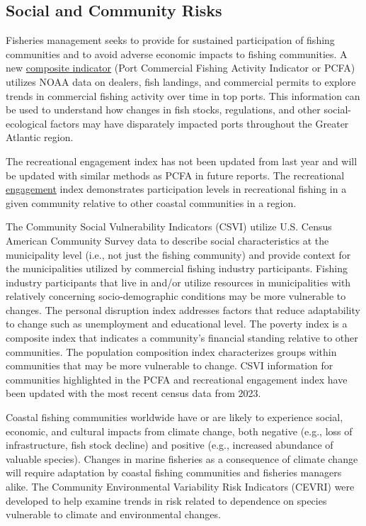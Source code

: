 \documentclass[
  10pt,
]{article}
\begin{document}
\subsection{Social and Community Risks}\label{social-and-community-risks}

Fisheries management seeks to provide for sustained participation of fishing communities and to avoid adverse economic impacts to fishing communities. A new \href{https://noaa-edab.github.io/catalog/engagement.html?q=engage\#introduction-to-indicator-72}{composite indicator} (Port Commercial Fishing Activity Indicator or PCFA) utilizes NOAA data on dealers, fish landings, and commercial permits to explore trends in commercial fishing activity over time in top ports. This information can be used to understand how changes in fish stocks, regulations, and other social-ecological factors may have disparately impacted ports throughout the Greater Atlantic region.

The recreational engagement index has not been updated from last year and will be updated with similar methods as PCFA in future reports. The recreational \href{https://noaa-edab.github.io/catalog/engagement.html}{engagement} index demonstrates participation levels in recreational fishing in a given community relative to other coastal communities in a region.

The Community Social Vulnerability Indicators (CSVI) utilize U.S. Census American Community Survey data to describe social characteristics at the municipality level (i.e., not just the fishing community) and provide context for the municipalities utilized by commercial fishing industry participants. Fishing industry participants that live in and/or utilize resources in municipalities with relatively concerning socio-demographic conditions may be more vulnerable to changes. The personal disruption index addresses factors that reduce adaptability to change such as unemployment and educational level. The poverty index is a composite index that indicates a community's financial standing relative to other communities. The population composition index characterizes groups within communities that may be more vulnerable to change. CSVI information for communities highlighted in the PCFA and recreational engagement index have been updated with the most recent census data from 2023.

Coastal fishing communities worldwide have or are likely to experience social, economic, and cultural impacts from climate change, both negative (e.g., loss of infrastructure, fish stock decline) and positive (e.g., increased abundance of valuable species). Changes in marine fisheries as a consequence of climate change will require adaptation by coastal fishing communities and fisheries managers alike. The Community Environmental Variability Risk Indicators (CEVRI) were developed to help examine trends in risk related to dependence on species vulnerable to climate and environmental changes.
\end{document}
